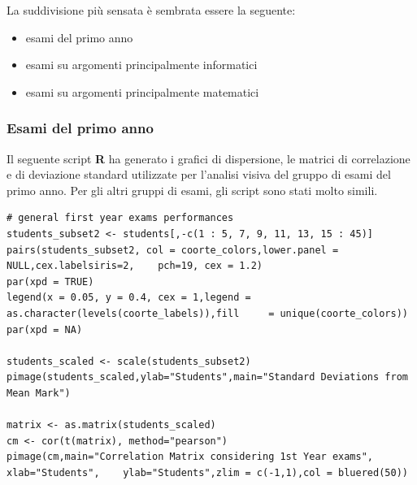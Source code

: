             La suddivisione più sensata è sembrata essere la seguente:

            \begin{itemize}
                \item esami del primo anno
                \item esami su argomenti principalmente informatici
                \item esami su argomenti principalmente matematici
            \end{itemize}

            \subsubsection{Esami del primo anno}

                Il seguente script \textbf{R} ha generato i grafici di dispersione, le matrici di correlazione e di deviazione standard utilizzate per l’analisi visiva del gruppo di esami del primo anno. Per gli altri gruppi di esami, gli script sono stati molto simili.

                \begin{lstlisting}
# general first year exams performances
students_subset2 <- students[,-c(1 : 5, 7, 9, 11, 13, 15 : 45)]
pairs(students_subset2, col = coorte_colors,lower.panel = NULL,cex.labelsiris=2, 	pch=19, cex = 1.2)
par(xpd = TRUE)
legend(x = 0.05, y = 0.4, cex = 1,legend = as.character(levels(coorte_labels)),fill 	= unique(coorte_colors))
par(xpd = NA)

students_scaled <- scale(students_subset2)
pimage(students_scaled,ylab="Students",main="Standard Deviations from Mean Mark")

matrix <- as.matrix(students_scaled)
cm <- cor(t(matrix), method="pearson")
pimage(cm,main="Correlation Matrix considering 1st Year exams", xlab="Students", 	ylab="Students",zlim = c(-1,1),col = bluered(50))
                \end{lstlisting}

